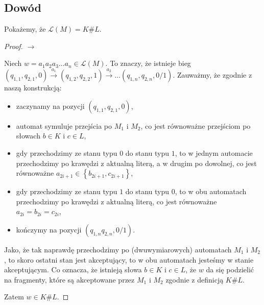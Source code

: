 \documentclass{article}
\theoremstyle{definition}
\theoremstyle{remark}
\begin{document}
\subsection{Dowód}

Pokażemy, że \(\mathcal{L}(M) = K \# L\).

\begin{proof}
    \(\rightarrow\)

    Niech \(w = a_1 a_2 a_3\ldots a_n \in \mathcal{L}(M)\). To znaczy, że istnieje bieg \( \left(q_{1,1}, q_{2,1}, 0 \right) \xrightarrow{a_1} \left(q_{1,2}, q_{2,2}, 1 \right) \xrightarrow{a_2} \ldots \left(q_{1,n}, q_{2,n}, 0/1 \right) \).
    Zauważmy, że zgodnie z naszą konstrukcją: 
    \begin{itemize}
        \item zaczynamy na pozycji \(\left(q_{1,1}, q_{2,1}, 0 \right)\),
        \item automat symuluje przejścia po \(M_1\) i \(M_2\), co jest równoważne przejściom po słowach \(b \in K\) i \(c \in L\),
        \item gdy przechodzimy ze stanu typu \(0\) do stanu typu \(1\), to w jednym automacie przechodzimy po krawędzi z aktualną literą, a w drugim po dowolnej,
        co jest równoważne \(a_{2i+1} \in \left\{ b_{2i+1}, c_{2i+1} \right\}\),
        \item gdy przechodzimy ze stanu typu \(1\) do stanu typu \(0\), to w obu automatach przechodzimy po krawędzi z aktualną literą,
        co jest równoważne \( a_{2i} = b_{2i} = c_{2i} \),
        \item kończymy na pozycji \(\left(q_{1,n} q_{2,n}, 0/1 \right)\).
    \end{itemize}

    Jako, że tak naprawdę przechodzimy po (dwuwymiarowych) automatach \(M_1\) i \(M_2\), to skoro ostatni stan jest akceptujący, to w obu automatach jesteśmy w stanie akceptującym.
    Co oznacza, że istnieją słowa \(b \in K\) i \(c \in L\), że \(w\) da się podzielić na fragmenty, które są akceptowane przez \(M_1\) i \(M_2\) zgodnie z definicją \(K \# L\).

    Zatem \(w \in K \# L\).

\end{proof}
\end{document}
